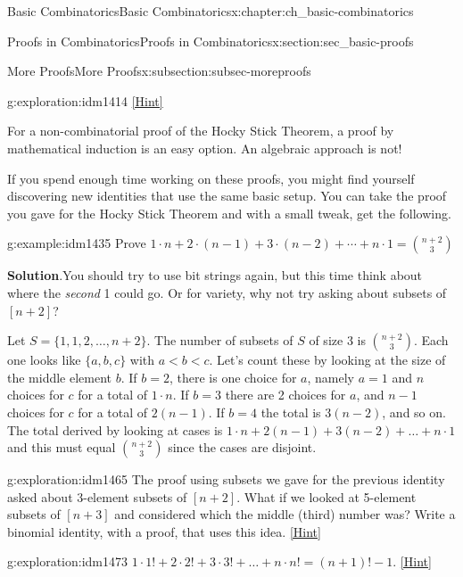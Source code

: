 \documentclass[oneside,10pt,]{book}
\numberwithin{equation}{chapter}
\newcommand{\lt}{<}
\begin{document}
\begin{chapterptx}{Basic Combinatorics}{}{Basic Combinatorics}{}{}{x:chapter:ch_basic-combinatorics}
\begin{sectionptx}{Proofs in Combinatorics}{}{Proofs in Combinatorics}{}{}{x:section:sec_basic-proofs}
\begin{subsectionptx}{More Proofs}{}{More Proofs}{}{}{x:subsection:subsec-moreproofs}
\begin{exploration}{}{g:exploration:idm1414}
\space\hspace*{0pt}\hfill{\tiny\hyperlink{g:hint:idm1418-back}{[Hint]}}\end{exploration}
For a non-combinatorial proof of the Hocky Stick Theorem, a proof by mathematical induction is an easy option. An algebraic approach is not!%
\par
If you spend enough time working on these proofs, you might find yourself discovering new identities that use the same basic setup.  You can take the proof you gave for the Hocky Stick Theorem and with a small tweak, get the following.%
\begin{example}{}{g:example:idm1435}%
Prove \(1\cdot n + 2 \cdot (n-1) + 3 \cdot (n-2) + \cdots + n \cdot 1 = \binom{n+2}{3}\)%
\par\smallskip%
\noindent\textbf{Solution}.\hypertarget{g:solution:idm1439}{}\quad{}You should try to use bit strings again, but this time think about where the \emph{second} 1 could go.  Or for variety, why not try asking about subsets of \([n+2]\)?%
\par
Let \(S = \{1,1,2,\ldots,n + 2\}\). The number of subsets of \(S\) of size 3 is \(\binom{n + 2}{3}\). Each one looks like \(\{a, b, c\}\) with \(a \lt b \lt c\). Let's count these by looking at the size of the middle element \(b\). If \(b=2\), there is one choice for \(a\), namely \(a=1\) and \(n\) choices for \(c\) for a total of \(1 \cdot n\). If \(b=3\) there are 2 choices for \(a\), and \(n - 1\) choices for \(c\) for a total of \(2(n - 1)\). If \(b=4\) the total is \(3(n - 2)\), and so on. The total derived by looking at cases is \(1 \cdot n + 2\left( n - 1 \right) + 3\left( n - 2 \right) + \ldots + n \cdot 1\) and this must equal \(\binom{n + 2}{3}\) since the cases are disjoint.%
\end{example}
\begin{exploration}{}{g:exploration:idm1465}%
The proof using subsets we gave for the previous identity asked about 3-element subsets of \([n+2]\).  What if we looked at 5-element subsets of \([n+3]\) and considered which the middle (third) number was?  Write a binomial identity, with a proof, that uses this idea.%
\space\hspace*{0pt}\hfill{\tiny\hyperlink{g:hint:idm1470-back}{[Hint]}}\end{exploration}
\begin{exploration}{}{g:exploration:idm1473}%
\(1 \cdot 1! + 2 \cdot 2! + 3 \cdot 3! + \ldots + n \cdot n! = \left( n + 1 \right)! - 1\).%
\space\hspace*{0pt}\hfill{\tiny\hyperlink{g:hint:idm1477-back}{[Hint]}}\end{exploration}

\end{subsectionptx}
\end{sectionptx}
\end{chapterptx}
\end{document}
